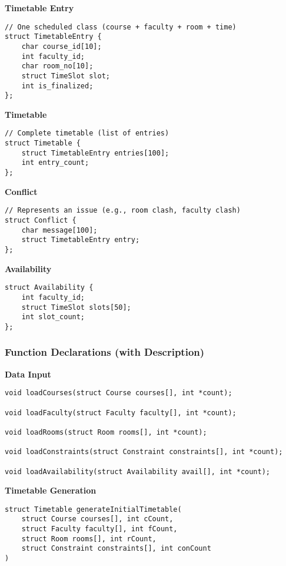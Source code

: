 \documentclass[12pt]{article}
\begin{document}
\noindent\textbf{Timetable Entry}
\begin{lstlisting}
// One scheduled class (course + faculty + room + time)
struct TimetableEntry {
    char course_id[10];
    int faculty_id;
    char room_no[10];
    struct TimeSlot slot;
    int is_finalized;
};
\end{lstlisting}

\noindent\textbf{Timetable}
\begin{lstlisting}
// Complete timetable (list of entries)
struct Timetable {
    struct TimetableEntry entries[100];
    int entry_count;
};
\end{lstlisting}

\noindent\textbf{Conflict}
\begin{lstlisting}
// Represents an issue (e.g., room clash, faculty clash)
struct Conflict {
    char message[100];
    struct TimetableEntry entry;
};
\end{lstlisting}

\noindent\textbf{Availability}
\begin{lstlisting}
struct Availability {
    int faculty_id;
    struct TimeSlot slots[50];
    int slot_count;
};
\end{lstlisting}

\subsubsection{Function Declarations (with Description)}

\noindent\textbf{Data Input}
\begin{lstlisting}
void loadCourses(struct Course courses[], int *count);

void loadFaculty(struct Faculty faculty[], int *count);

void loadRooms(struct Room rooms[], int *count);

void loadConstraints(struct Constraint constraints[], int *count);

void loadAvailability(struct Availability avail[], int *count);
\end{lstlisting}

\noindent\textbf{Timetable Generation}
\begin{lstlisting}
struct Timetable generateInitialTimetable(
    struct Course courses[], int cCount,
    struct Faculty faculty[], int fCount,
    struct Room rooms[], int rCount,
    struct Constraint constraints[], int conCount
)
\end{lstlisting}
\end{document}
